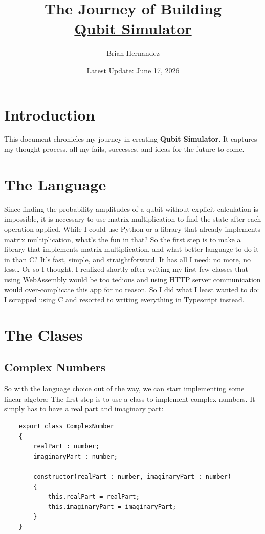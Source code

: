 \documentclass{article}
\title{The Journey of Building \\ \underline{Qubit Simulator}}
\author{Brian Hernandez}
\date{Latest Update: June 17, 2026}
\begin{document}
\maketitle

\section{Introduction}

This document chronicles my journey in creating \textbf{Qubit Simulator}. It captures my thought process, all my fails, successes, and ideas for the future to come. 

\section{The Language}

Since finding the probability amplitudes of a qubit without explicit calculation is impossible, it is necessary to use matrix multiplication to find the state after each operation applied. While I could use Python or a library that already implements matrix multiplication, what's the fun in that?\newline{}
So the first step is to make a library that implements matrix multiplication, and what better language to do it in than C?
It's fast, simple, and straightforward. It has all I need: no more, no less\dots
Or so I thought. I realized shortly after writing my first few classes that using WebAssembly would be too tedious and using HTTP server communication would over-complicate this app for no reason. 
So I did what I least wanted to do: I scrapped using C and resorted to writing everything in Typescript instead.


\section{The Clases}
\subsection{Complex Numbers}
So with the language choice out of the way, we can start implementing some linear algebra: The first step is to use a class to implement complex numbers. It simply has to have a real part and imaginary part:
\\
\begin{verbatim}
    export class ComplexNumber 
    {
        realPart : number;
        imaginaryPart : number;

        constructor(realPart : number, imaginaryPart : number) 
        {
            this.realPart = realPart;
            this.imaginaryPart = imaginaryPart;
        }
    }
\end{verbatim}
\end{document}
